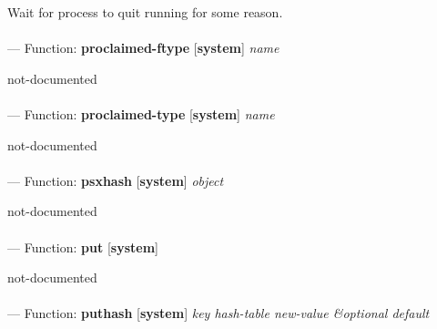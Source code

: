 \begin{adjustwidth}{5em}{5em}
Wait for process to quit running for some reason.
\end{adjustwidth}

\paragraph{}
\label{SYSTEM:PROCLAIMED-FTYPE}
--- Function: \textbf{proclaimed-ftype} [\textbf{system}] \textit{name}

\begin{adjustwidth}{5em}{5em}
not-documented
\end{adjustwidth}

\paragraph{}
\label{SYSTEM:PROCLAIMED-TYPE}
--- Function: \textbf{proclaimed-type} [\textbf{system}] \textit{name}

\begin{adjustwidth}{5em}{5em}
not-documented
\end{adjustwidth}

\paragraph{}
\label{SYSTEM:PSXHASH}
--- Function: \textbf{psxhash} [\textbf{system}] \textit{object}

\begin{adjustwidth}{5em}{5em}
not-documented
\end{adjustwidth}

\paragraph{}
\label{SYSTEM:PUT}
--- Function: \textbf{put} [\textbf{system}] \textit{}

\begin{adjustwidth}{5em}{5em}
not-documented
\end{adjustwidth}

\paragraph{}
\label{SYSTEM:PUTHASH}
--- Function: \textbf{puthash} [\textbf{system}] \textit{key hash-table new-value \&optional default}

